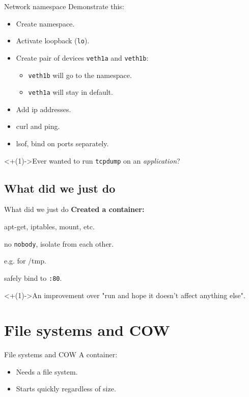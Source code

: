 \documentclass[14pt]{beamer}
\begin{document}
\begin{frame}{Network namespace}
    Demonstrate this:
    \begin{itemize}[<+(1)->]
        \item Create namespace.
        \item Activate loopback ({\tt lo}).
        \item Create pair of devices {\tt veth1a} and {\tt veth1b}:
            \begin{itemize}
                \item {\tt veth1b} will go to the namespace.
                \item {\tt veth1a} will stay in default.
            \end{itemize}
        \item Add ip addresses.
        \item curl and ping.
        \item lsof, bind on ports separately.
    \end{itemize}
    \onslide<+(1)->{\small Ever wanted to run {\tt tcpdump} on an {\em application}?}
\end{frame}

\subsection{What did we just do}
\begin{frame}{What did we just do}
    \relax
    {\bf Created a container:}
    \begin{description}[<+(1)->]
        \item[User namespace] apt-get, iptables, mount, etc.
        \item[Isolated pids] no {\tt nobody}, isolate from each other.
        \item[Isolated mounts] e.g. for /tmp.
        \item[Isolated network] safely bind to {\tt :80}.
    \end{description}
    \onslide<+(1)->{An improvement over "run and hope it doesn't affect anything else".}
\end{frame}

\section{File systems and COW}
\begin{frame}{File systems and COW}
    A container:
    \begin{itemize}[<+->]
        \item Needs a file system.
        \item Starts quickly regardless of size.
    \end{itemize}



\end{frame}
\end{document}

